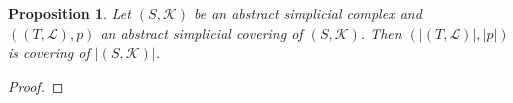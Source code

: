 \documentclass{amsart}
\newtheorem{proposition}{Proposition}[section]
\begin{document}
\begin{proposition}
Let $(S,\mathcal{K})$ be an abstract simplicial complex and $((T,\mathcal{L}),p)$ an abstract simplicial covering of $(S,\mathcal{K})$. Then $(\vert (T,\mathcal{L})\vert,\vert p\vert)$ is covering of $\vert (S,\mathcal{K})\vert$.
\end{proposition}

\begin{proof}

\end{proof}





\end{document}
